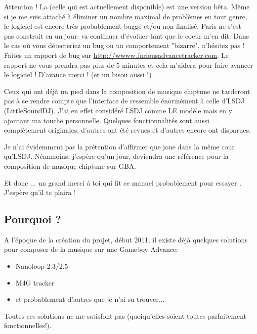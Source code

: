 \documentclass[12pt,a4paper]{article}
\begin{document}
    Attention ! La \fatversion (celle qui est actuellement disponible) est une version bêta.
    Même si je me suis attaché à éliminer un nombre maximal de problèmes en tout genre, le logiciel est encore très probablement buggé et/ou non finalisé.
    Paris ne s'est pas construit en un jour: \FAT va continuer d'évoluer tant que le coeur m'en dit.
    Dans le cas où vous détecteriez un bug ou un comportement "bizarre", n'hésitez pas !
    Faites un rapport de bug sur \url{http://wwww.furiousadvancetracker.com}.
    Le rapport ne vous prendra pas plus de 5 minutes et cela m'aidera pour faire avancer le logiciel !
    D'avance merci ! (et un bisou aussi !)
    \medskip
    
    Ceux qui ont déjà un pied dans la composition de musique chiptune ne tarderont pas à se rendre compte que l'interface de \FAT ressemble énormément à celle d'LSDJ (LittleSoundDJ).
    J'ai en effet considéré LSDJ comme LE modèle mais en y ajoutant ma touche personnelle.
    Quelques fonctionnalités sont aussi complétement originales, d'autres ont été revues et d'autres encore ont disparues.
    \medskip
    
    Je n'ai évidemment pas la prétention d'affirmer que \FAT joue dans la même cour qu'LSDJ.
    Néanmoins, j'espère qu'un jour, \FAT deviendra une référence pour la composition de musique chiptune sur GBA.\medskip
    
    Et donc ... un grand merci à toi qui lit ce manuel probablement pour essayer \FAT. J'espère qu'il te plaira !
  
    \subsection{Pourquoi \FAT ?}
    A l'époque de la création du projet, début 2011, il existe déjà quelques solutions pour composer de la musique sur une Gameboy Advance:
    \medskip
    
    \begin{itemize}
        \item{Nanoloop 2.3/2.5}
        \item{M4G tracker}
        \item{et probablement d'autres que je n'ai su trouver...}
    \end{itemize}\medskip
    
    Toutes ces solutions ne me satisfont pas (quoiqu'elles soient toutes parfaitement fonctionnelles!).
    \medskip
    
\end{document}
